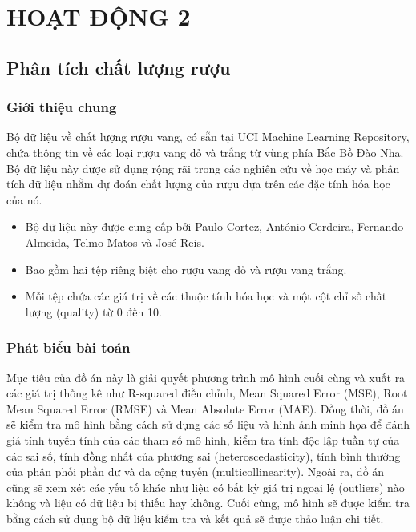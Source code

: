 \chapter{HOẠT ĐỘNG 2}


\section{Phân tích chất lượng rượu}


\subsection{Giới thiệu chung}

Bộ dữ liệu về chất lượng rượu vang, có sẵn tại UCI Machine Learning Repository, chứa thông tin về các loại rượu vang đỏ và trắng từ vùng phía Bắc Bồ Đào Nha. Bộ dữ liệu này được sử dụng rộng rãi trong các nghiên cứu về học máy và phân tích dữ liệu nhằm dự đoán chất lượng của rượu dựa trên các đặc tính hóa học của nó.
\begin{itemize}
    \item Bộ dữ liệu này được cung cấp bởi Paulo Cortez, António Cerdeira, Fernando Almeida, Telmo Matos và José Reis.
    \item Bao gồm hai tệp riêng biệt cho rượu vang đỏ và rượu vang trắng.
    \item Mỗi tệp chứa các giá trị về các thuộc tính hóa học và một cột chỉ số chất lượng (quality) từ 0 đến 10.
\end{itemize}

\subsection{Phát biểu bài toán}

Mục tiêu của đồ án này là giải quyết phương trình mô hình cuối cùng và xuất ra các giá trị thống kê như R-squared điều chỉnh, Mean Squared Error (MSE), Root Mean Squared Error (RMSE) và Mean Absolute Error (MAE). Đồng thời, đồ án sẽ kiểm tra mô hình bằng cách sử dụng các số liệu và hình ảnh minh họa để đánh giá tính tuyến tính của các tham số mô hình, kiểm tra tính độc lập tuần tự của các sai số, tính đồng nhất của phương sai (heteroscedasticity), tính bình thường của phân phối phần dư và đa cộng tuyến (multicollinearity). Ngoài ra, đồ án cũng sẽ xem xét các yếu tố khác như liệu có bất kỳ giá trị ngoại lệ (outliers) nào không và liệu có dữ liệu bị thiếu hay không. Cuối cùng, mô hình sẽ được kiểm tra bằng cách sử dụng bộ dữ liệu kiểm tra và kết quả sẽ được thảo luận chi tiết.

